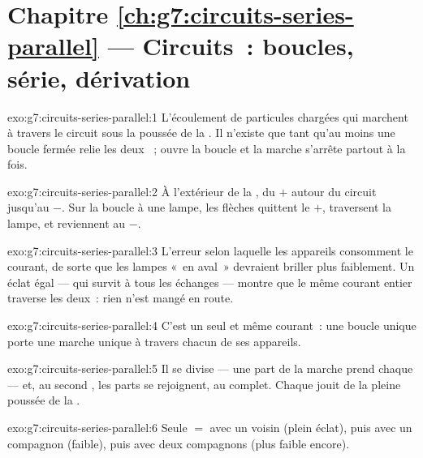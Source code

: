 \section*{Chapitre \ref{ch:g7:circuits-series-parallel} --- Circuits~: boucles, série, dérivation}

\begin{solution}{exo:g7:circuits-series-parallel:1}
L'écoulement de particules chargées qui marchent à travers le circuit
sous la poussée de la . Il n'existe que tant qu'au moins une
boucle fermée relie les deux ~; ouvre la boucle et la marche
s'arrête partout à la fois.
\end{solution}

\begin{solution}{exo:g7:circuits-series-parallel:2}
À l'extérieur de la , du $+$ autour du circuit jusqu'au $-$. Sur
la boucle à une lampe, les flèches quittent le $+$, traversent la
lampe, et reviennent au $-$.
\end{solution}

\begin{solution}{exo:g7:circuits-series-parallel:3}
L'erreur selon laquelle les appareils consomment le courant, de sorte
que les lampes «~en aval~» devraient briller plus faiblement. Un
éclat égal --- qui survit à tous les échanges --- montre que le même
courant entier traverse les deux~: rien n'est mangé en route.
\end{solution}

\begin{solution}{exo:g7:circuits-series-parallel:4}
C'est un seul et même courant~: une boucle unique porte une marche
unique à travers chacun de ses appareils.
\end{solution}

\begin{solution}{exo:g7:circuits-series-parallel:5}
Il se divise --- une part de la marche prend chaque  --- et,
au second , les parts se rejoignent, au complet. Chaque 
jouit de la pleine poussée de la .
\end{solution}

\begin{solution}{exo:g7:circuits-series-parallel:6}
Seule $=$ avec un voisin  (plein éclat), puis avec un
compagnon  (faible), puis avec deux compagnons  (plus
faible encore).
\end{solution}

